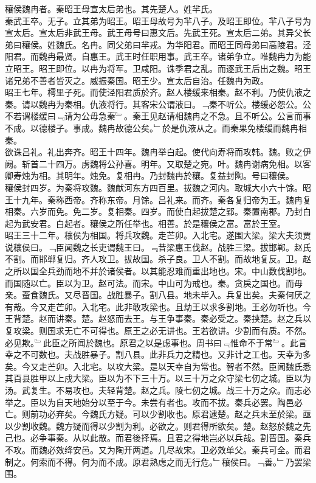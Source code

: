 \documentclass{zhvt-classic}
\begin{document}

\hspace*{2em}穰侯魏冉者。秦昭王母宣太后弟也。其先楚人。姓羋氏。\\
\hspace*{2em}秦武王卒。无子。立其弟为昭王。昭王母故号为羋八子。及昭王即位。羋八子号为宣太后。宣太后非武王母。武王母号曰惠文后。先武王死。宣太后二弟。其异父长弟曰穰侯。姓魏氏。名冉。同父弟曰羋戎。为华阳君。而昭王同母弟曰高陵君。泾阳君。而魏冉最贤。自惠王。武王时任职用事。武王卒。诸弟争立。唯魏冉力为能立昭王。昭王即位。以冉为将军。卫咸阳。诛季君之乱。而逐武王后出之魏。昭王诸兄弟不善者皆灭之。威振秦国。昭王少。宣太后自治。任魏冉为政。\\
\hspace*{2em}昭王七年。樗里子死。而使泾阳君质於齐。赵人楼缓来相秦。赵不利。乃使仇液之秦。请以魏冉为秦相。仇液将行。其客宋公谓液曰。﹁秦不听公。楼缓必怨公。公不若谓楼缓曰﹃请为公毋急秦﹄。秦王见赵请相魏冉之不急。且不听公。公言而事不成。以德楼子。事成。魏冉故德公矣。﹂於是仇液从之。而秦果免楼缓而魏冉相秦。\\
\hspace*{2em}欲诛吕礼。礼出奔齐。昭王十四年。魏冉举白起。使代向寿将而攻韩。魏。败之伊阙。斩首二十四万。虏魏将公孙喜。明年。又取楚之宛。叶。魏冉谢病免相。以客卿寿烛为相。其明年。烛免。复相冉。乃封魏冉於穰。复益封陶。号曰穰侯。\\
\hspace*{2em}穰侯封四岁。为秦将攻魏。魏献河东方四百里。拔魏之河内。取城大小六十馀。昭王十九年。秦称西帝。齐称东帝。月馀。吕礼来。而齐。秦各复归帝为王。魏冉复相秦。六岁而免。免二岁。复相秦。四岁。而使白起拔楚之郢。秦置南郡。乃封白起为武安君。白起者。穰侯之所任举也。相善。於是穰侯之富。富於王室。\\
\hspace*{2em}昭王三十二年。穰侯为相国。将兵攻魏。走芒卯。入北宅。遂围大梁。梁大夫须贾说穰侯曰。﹁臣闻魏之长吏谓魏王曰。﹃昔梁惠王伐赵。战胜三梁。拔邯郸。赵氏不割。而邯郸复归。齐人攻卫。拔故国。杀子良。卫人不割。而故地复反。卫。赵之所以国全兵劲而地不并於诸侯者。以其能忍难而重出地也。宋。中山数伐割地。而国随以亡。臣以为卫。赵可法。而宋。中山可为戒也。秦。贪戾之国也。而毋亲。蚕食魏氏。又尽晋国。战胜暴子。割八县。地未毕入。兵复出矣。夫秦何厌之有哉。今又走芒卯。入北宅。此非敢攻梁也。且劫王以求多割地。王必勿听也。今王背楚。赵而讲秦。楚。赵怒而去王。与王争事秦。秦必受之。秦挟楚。赵之兵以复攻梁。则国求无亡不可得也。原王之必无讲也。王若欲讲。少割而有质。不然。必见欺。﹄此臣之所闻於魏也。原君之以是虑事也。周书曰﹃惟命不于常﹄。此言幸之不可数也。夫战胜暴子。割八县。此非兵力之精也。又非计之工也。天幸为多矣。今又走芒卯。入北宅。以攻大梁。是以天幸自为常也。智者不然。臣闻魏氏悉其百县胜甲以上戍大梁。臣以为不下三十万。以三十万之众守梁七仞之城。臣以为汤。武复生。不易攻也。夫轻背楚。赵之兵。陵七仞之城。战三十万之众。而志必举之。臣以为自天地始分以至于今。未尝有者也。攻而不拔。秦兵必罢。陶邑必亡。则前功必弃矣。今魏氏方疑。可以少割收也。原君逮楚。赵之兵未至於梁。亟以少割收魏。魏方疑而得以少割为利。必欲之。则君得所欲矣。楚。赵怒於魏之先己也。必争事秦。从以此散。而君後择焉。且君之得地岂必以兵哉。割晋国。秦兵不攻。而魏必效绛安邑。又为陶开两道。几尽故宋。卫必效单父。秦兵可全。而君制之。何索而不得。何为而不成。原君熟虑之而无行危。﹂穰侯曰。﹁善。﹂乃罢梁围。\\
\end{document}
